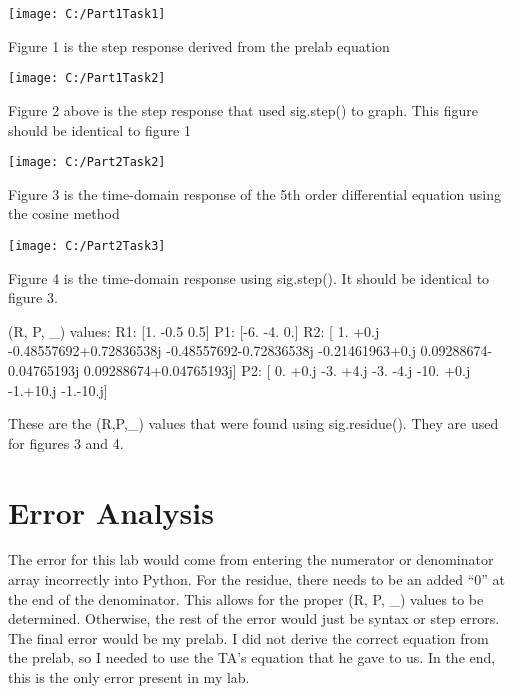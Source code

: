 \documentclass[12pt]{report}
\begin{document}
\begin{figure1}
	\centering
	\texttt{[image: C:/Part1Task1]}
	\caption{}
	\label{fig:part1task1}
\end{figure1}

Figure 1 is the step response derived from the prelab equation

\begin{figure2}
	\centering
	\texttt{[image: C:/Part1Task2]}
	\caption{}
	\label{fig:part1task2}
\end{figure2}

Figure 2 above is the step response that used sig.step() to graph. This figure should be identical to figure 1

\begin{figure3}
	\centering
	\texttt{[image: C:/Part2Task2]}
	\caption{}
	\label{fig:part2task2}
\end{figure3}

Figure 3 is the time-domain response of the 5th order differential equation using the cosine method

\begin{figure4}
	\centering
	\texttt{[image: C:/Part2Task3]}
	\caption{}
	\label{fig:part2task3}
\end{figure4}

Figure 4 is the time-domain response using sig.step(). It should be identical to figure 3.

(R, P, _) values: 
R1: [1.  -0.5  0.5]
P1: [-6. -4.  0.]
R2: [ 1.        +0.j         -0.48557692+0.72836538j -0.48557692-0.72836538j
-0.21461963+0.j          0.09288674-0.04765193j  0.09288674+0.04765193j]
P2: [  0. +0.j  -3. +4.j  -3. -4.j -10. +0.j  -1.+10.j  -1.-10.j]

These are the (R,P,_) values that were found using sig.residue(). They are used for figures 3 and 4.

\section{Error Analysis}

 The error for this lab would come from entering the numerator or denominator array incorrectly into Python. For the residue, there needs to be an added “0” at the end of the denominator. This allows for the proper (R, P, _) values to be determined. Otherwise, the rest of the error would just be syntax or step errors. The final error would be my prelab. I did not derive the correct equation from the prelab, so I needed to use the TA’s equation that he gave to us. In the end, this is the only error present in my lab.
\end{document}
